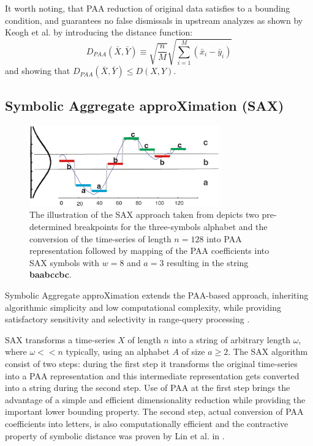\documentclass[conference]{worldcomp}
\begin{document}
It worth noting, that PAA reduction of original data satisfies to a bounding condition, and 
guarantees no false dismissals in upstream analyzes as shown by Keogh et al. \cite{citeulike:3000416}
by introducing the distance function:
\begin{equation}
D_{PAA}(\bar{X}, \bar{Y}) \equiv \sqrt{\frac{n}{M}} \sqrt{ \sum_{i=1}^{M} 
\left(  \bar{x}_{i} - \bar{y}_{i} \right)}
\label{eq:paa_distance}
\end{equation}
and showing that $D_{PAA}(\bar{X}, \bar{Y}) \leq D(X,Y)$.

\subsection{Symbolic Aggregate approXimation (SAX)} \label{sax}
\begin{figure}[b]
   \centering
   \includegraphics[height=35mm]{figures/sax_intro.eps}
   \caption{The illustration of the SAX approach taken from \cite{citeulike:2821475} depicts 
    two pre-determined breakpoints for the three-symbols alphabet and the conversion of the time-series of 
    length $n=128$ into PAA representation followed by mapping of the PAA coefficients into SAX symbols with 
    $w=8$ and $a=3$ resulting in the string \textbf{baabccbc}.}
   \label{fig:sax_intro}
\end{figure}

Symbolic Aggregate approXimation extends the PAA-based approach, inheriting algorithmic 
simplicity and low computational complexity, while providing satisfactory sensitivity and 
selectivity in range-query processing \cite{citeulike:2821475}. 

SAX transforms a time-series $X$ of length $n$ into a string of arbitrary length $\omega$, 
where $\omega << n$ typically, using an alphabet $A$ of size $ a \geq 2$. 
The SAX algorithm consist of two steps: during the first step it transforms the original time-series 
into a PAA representation and this intermediate representation gets converted into a string during the second step. 
Use of PAA at the first step brings the advantage of a simple and efficient dimensionality reduction while 
providing the important lower bounding property. 
The second step, actual conversion of PAA coefficients into letters, is also computationally efficient 
and the contractive property of symbolic distance was proven by Lin et al. in \cite{citeulike:532335}.
\end{document}
